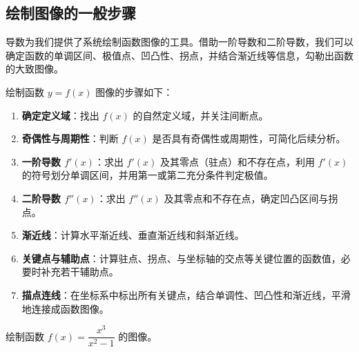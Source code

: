 \subsection*{绘制图像的一般步骤}

导数为我们提供了系统绘制函数图像的工具。借助一阶导数和二阶导数，我们可以确定函数的单调区间、极值点、凹凸性、拐点，并结合渐近线等信息，勾勒出函数的大致图像。



绘制函数 $y=f(x)$ 图像的步骤如下：

\begin{enumerate}
	\item \textbf{确定定义域}：找出 $f(x)$ 的自然定义域，并关注间断点。
	\item \textbf{奇偶性与周期性}：判断 $f(x)$ 是否具有奇偶性或周期性，可简化后续分析。
	\item \textbf{一阶导数 $f'(x)$}：求出 $f'(x)$ 及其零点（驻点）和不存在点，利用 $f'(x)$ 的符号划分单调区间，并用第一或第二充分条件判定极值。
	\item \textbf{二阶导数 $f''(x)$}：求出 $f''(x)$ 及其零点和不存在点，确定凹凸区间与拐点。
	\item \textbf{渐近线}：计算水平渐近线、垂直渐近线和斜渐近线。
	\item \textbf{关键点与辅助点}：计算驻点、拐点、与坐标轴的交点等关键位置的函数值，必要时补充若干辅助点。
	\item \textbf{描点连线}：在坐标系中标出所有关键点，结合单调性、凹凸性和渐近线，平滑地连接成函数图像。
\end{enumerate}



\begin{example}
	绘制函数 $f(x)=\dfrac{x^3}{x^2-1}$ 的图像。
\end{example}

